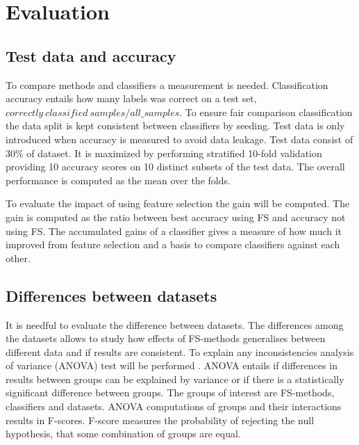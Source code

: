 \section{Evaluation}
\label{Evaluation}

\subsection{Test data and accuracy}

To compare methods and classifiers a measurement is needed. Classification accuracy entails how many labels was correct on a test set, $correctly\:classified\:samples/all\_samples$. To ensure fair comparison classification the data split is kept consistent between classifiers by seeding. Test data is only introduced when accuracy is measured to avoid data leakage. Test data consist of 30\% of dataset. It is maximized by performing stratified 10-fold validation providing 10 accuracy scores on 10 distinct subsets of the test data. The overall performance is computed as the mean over the folds.

To evaluate the impact of using feature selection the gain will be computed. The gain is computed as the ratio between best accuracy using FS and accuracy not using FS. The accumulated gains of a classifier gives a measure of how much it improved from feature selection and a basis to compare classifiers against each other.

\subsection{Differences between datasets}

It is needful to evaluate the difference between datasets. The differences among the datasets allows to study how effects of FS-methods generalises between different data and if results are consistent. To explain any inconsistencies analysis of variance (ANOVA) test will be performed \parencite{sthle1989}. ANOVA entails if differences in results between groups can be explained by variance or if there is a statistically significant difference between groups. The groups of interest are FS-methods, classifiers and datasets. ANOVA computations of groups and their interactions results in F-scores. F-score measures the probability of rejecting the null hypothesis, that some combination of groups are equal.
